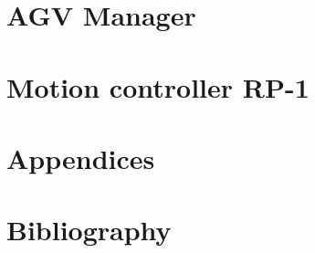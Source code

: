 
\sloppy




%
%
%
%

\part{AGV Manager}





\part{Motion controller RP-1}






\part{Appendices}


\part{Bibliography}
%
%


